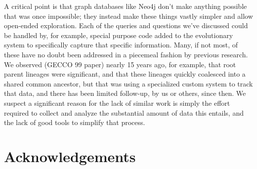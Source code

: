 \documentclass[12pt]{article}
\begin{document}
A critical point is that graph databases like Neo4j don't make anything possible that was once impossible; they instead make these things vastly simpler and allow open-ended exploration. Each of the queries and questions we've discussed could be handled by, for example, special purpose code added to the evolutionary system to specifically capture that specific information. Many, if not most, of these have no doubt been addressed in a piecemeal fashion by previous research. We observed (GECCO 99 paper) nearly 15 years ago, for example, that root parent lineages were significant, and that these lineages quickly coalesced into a shared common ancestor, but that was using a specialized custom system to track that data, and there has been limited follow-up, by us or others, since then. We suspect a significant reason for the lack of similar work is simply the effort required to collect and analyze the substantial amount of data this entails, and the lack of good tools to simplify that process.

\section*{Acknowledgements}



\end{document}
